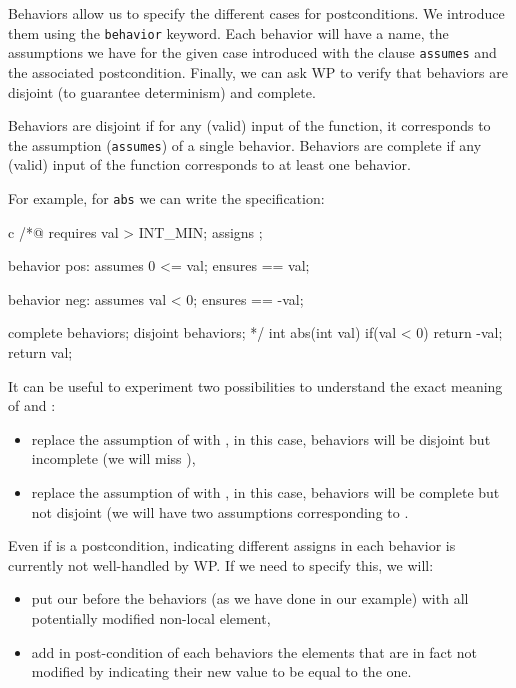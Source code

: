 \documentclass[middle]{zmdocument}
\begin{document}
Behaviors allow us to specify the different cases for postconditions. We
introduce them using the \texttt{behavior} keyword. Each behavior will
have a name, the assumptions we have for the given case introduced with
the clause \texttt{assumes} and the associated postcondition. Finally,
we can ask WP to verify that behaviors are disjoint (to guarantee
determinism) and complete.

Behaviors are disjoint if for any (valid) input of the function, it
corresponds to the assumption (\texttt{assumes}) of a single behavior.
Behaviors are complete if any (valid) input of the function corresponds
to at least one behavior.

For example, for \texttt{abs} we can write the specification:



\begin{CodeBlock}{c}
/*@
  requires val > INT_MIN;
  assigns  \nothing;

  behavior pos:
    assumes 0 <= val;
    ensures \result == val;
  
  behavior neg:
    assumes val < 0;
    ensures \result == -val;
 
  complete behaviors;
  disjoint behaviors;
*/
int abs(int val){
  if(val < 0) return -val;
  return val;
}
\end{CodeBlock}



It can be useful to experiment two possibilities to understand the exact
meaning of  and :

\begin{itemize}
\item
  replace the assumption of  with
  , in this case, behaviors will be
  disjoint but incomplete (we will miss ),
\item
  replace the assumption of  with
  , in this case, behaviors will be
  complete but not disjoint (we will have two assumptions corresponding
  to .
\end{itemize}


\begin{Warning}
  Even if  is a postcondition, indicating different assigns
  in each behavior is currently not well-handled by WP. If we need to specify
  this, we will:
  \begin{itemize}
  \item put our  before the behaviors (as we have done in our
    example) with all potentially modified non-local element,
  \item add in post-condition of each behaviors the elements that are in fact
    not modified by indicating their new value to be equal to the
     one.
  \end{itemize}
\end{Warning}
\end{document}
